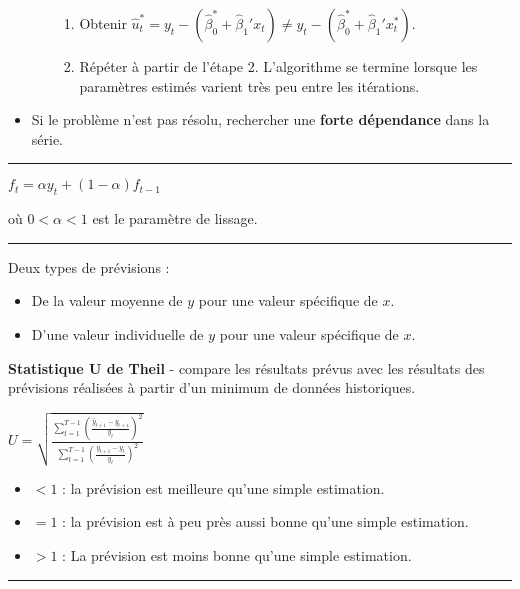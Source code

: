 \begin{f}[Correction]
\begin{itemize}[leftmargin=*]
\begin{itemize}[leftmargin=*]
\begin{enumerate}[leftmargin=*]
	\item Obtenir \(\hat{u}_{t}^{*} = y_{t} - (\hat{\beta}_{0}^{*} + \hat{\beta}_{1}' x_{t}) \neq y_ {t} - (\hat{\beta}_{0}^{*} + \hat{\beta}_{1}' x_{t}^{*})\).
	\item Répéter à partir de l'étape 2. L'algorithme se termine lorsque les paramètres estimés varient très peu entre les itérations.
\end{enumerate}
\end{itemize}

\item Si le problème n'est pas résolu, rechercher une \textbf{forte dépendance} dans la série.
\end{itemize}

\end{f}  
\columnbreak

\hrule

\begin{f}

\begin{center}
	\(f_{t} = \alpha y_{t} + (1 - \alpha) f_{t - 1}\)
\end{center}

où \(0 < \alpha < 1\) est le paramètre de lissage.

\end{f}  \hrule

\begin{f}[Prévisions]

Deux types de prévisions :

\begin{itemize}[leftmargin=*]
	\item De la valeur moyenne de \(y\) pour une valeur spécifique de \(x\).
	\item D'une valeur individuelle de \(y\) pour une valeur spécifique de \(x\).
\end{itemize}

\textbf{Statistique U de Theil} - compare les résultats prévus avec les résultats des prévisions réalisées à partir d'un minimum de données historiques.

\begin{center}
	\(U = \sqrt{\frac{\sum_{t=1}^{T-1} \left( \frac{\hat{y}_{t+1} - y_{t+1}}{y_t} \right)^2}{\sum_{t=1}^{T-1} \left( \frac{y_ {t+1} - y_t}{y_t} \right)^2}}\)
\end{center}

\begin{itemize}[leftmargin=*]
	\item \(< 1\) : la prévision est meilleure qu'une simple estimation.
	\item \(= 1\) : la prévision est à peu près aussi bonne qu'une simple estimation.
	\item \(> 1\) : La prévision est moins bonne qu'une simple estimation.
\end{itemize}



\end{f}  \hrule

